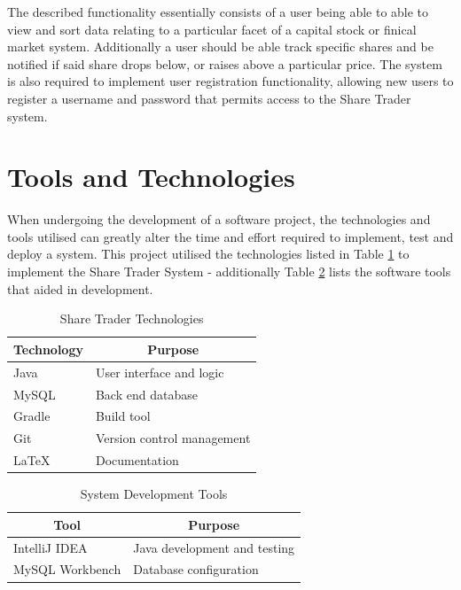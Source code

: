 \documentclass[12pt, a4paper,titlepage]{article}
\begin{document}
The described functionality essentially consists of a user being able to
able to view and sort data relating to a particular facet of a capital stock or
finical market system.
Additionally a user should be able track specific shares and be notified if said
share drops below, or raises above a particular price.
The system is also required to implement user registration functionality,
allowing new users to register a username and password that permits access to
the Share Trader system.


\section{Tools and Technologies}
When undergoing the development of a software project, the technologies
and tools utilised can greatly alter the time and effort required to
implement, test and deploy a system.
This project utilised the technologies listed in Table \ref{table-tech} to
implement the Share Trader System - additionally Table \ref{table-tool} lists
the software tools that aided in development.

\begin{table}[h]
    \centering
    \begin{tabular}{|l|l|}
        \hline
        \textbf{Technology}  & \multicolumn{1}{c|}{\textbf{Purpose}} \\ \hline
        Java        & User interface and logic     \\ \hline
        MySQL       & Back end database            \\ \hline
        Gradle      & Build tool                   \\ \hline
        Git         & Version control management   \\ \hline
        \LaTeX      & Documentation                \\ \hline
    \end{tabular}
    \caption{Share Trader Technologies}
    \label{table-tech}
\end{table}

\begin{table}[h]
    \centering
    \begin{tabular}{|l|l|}
        \hline
        \multicolumn{1}{|c|}{\textbf{Tool}} &
        \multicolumn{1}{c|}{\textbf{Purpose}} \\ \hline
        IntelliJ IDEA                       & Java development and testing
        \\ \hline
        MySQL Workbench                     & Database configuration
        \\ \hline
    \end{tabular}
    \caption{System Development Tools}
    \label{table-tool}
\end{table}
\end{document}
